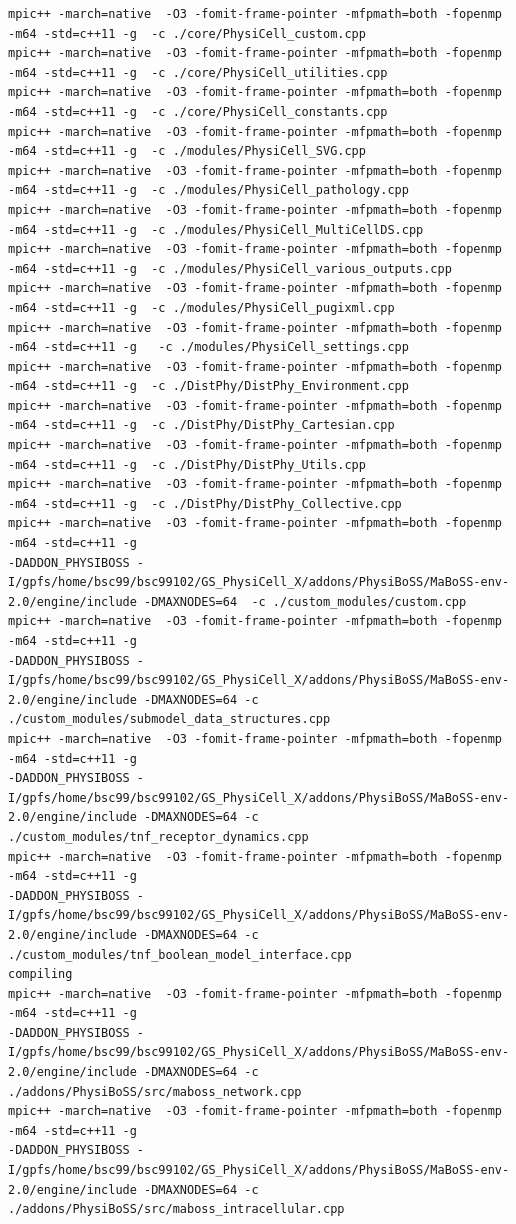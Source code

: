 \documentclass[12pt]{article}
\begin{document}
\begin{tiny}
\begin{verbatim}
mpic++ -march=native  -O3 -fomit-frame-pointer -mfpmath=both -fopenmp -m64 -std=c++11 -g  -c ./core/PhysiCell_custom.cpp 
mpic++ -march=native  -O3 -fomit-frame-pointer -mfpmath=both -fopenmp -m64 -std=c++11 -g  -c ./core/PhysiCell_utilities.cpp 
mpic++ -march=native  -O3 -fomit-frame-pointer -mfpmath=both -fopenmp -m64 -std=c++11 -g  -c ./core/PhysiCell_constants.cpp
mpic++ -march=native  -O3 -fomit-frame-pointer -mfpmath=both -fopenmp -m64 -std=c++11 -g  -c ./modules/PhysiCell_SVG.cpp
mpic++ -march=native  -O3 -fomit-frame-pointer -mfpmath=both -fopenmp -m64 -std=c++11 -g  -c ./modules/PhysiCell_pathology.cpp
mpic++ -march=native  -O3 -fomit-frame-pointer -mfpmath=both -fopenmp -m64 -std=c++11 -g  -c ./modules/PhysiCell_MultiCellDS.cpp
mpic++ -march=native  -O3 -fomit-frame-pointer -mfpmath=both -fopenmp -m64 -std=c++11 -g  -c ./modules/PhysiCell_various_outputs.cpp
mpic++ -march=native  -O3 -fomit-frame-pointer -mfpmath=both -fopenmp -m64 -std=c++11 -g  -c ./modules/PhysiCell_pugixml.cpp
mpic++ -march=native  -O3 -fomit-frame-pointer -mfpmath=both -fopenmp -m64 -std=c++11 -g   -c ./modules/PhysiCell_settings.cpp	
mpic++ -march=native  -O3 -fomit-frame-pointer -mfpmath=both -fopenmp -m64 -std=c++11 -g  -c ./DistPhy/DistPhy_Environment.cpp
mpic++ -march=native  -O3 -fomit-frame-pointer -mfpmath=both -fopenmp -m64 -std=c++11 -g  -c ./DistPhy/DistPhy_Cartesian.cpp
mpic++ -march=native  -O3 -fomit-frame-pointer -mfpmath=both -fopenmp -m64 -std=c++11 -g  -c ./DistPhy/DistPhy_Utils.cpp
mpic++ -march=native  -O3 -fomit-frame-pointer -mfpmath=both -fopenmp -m64 -std=c++11 -g  -c ./DistPhy/DistPhy_Collective.cpp
mpic++ -march=native  -O3 -fomit-frame-pointer -mfpmath=both -fopenmp -m64 -std=c++11 -g  
-DADDON_PHYSIBOSS -I/gpfs/home/bsc99/bsc99102/GS_PhysiCell_X/addons/PhysiBoSS/MaBoSS-env-2.0/engine/include -DMAXNODES=64  -c ./custom_modules/custom.cpp
mpic++ -march=native  -O3 -fomit-frame-pointer -mfpmath=both -fopenmp -m64 -std=c++11 -g  
-DADDON_PHYSIBOSS -I/gpfs/home/bsc99/bsc99102/GS_PhysiCell_X/addons/PhysiBoSS/MaBoSS-env-2.0/engine/include -DMAXNODES=64 -c ./custom_modules/submodel_data_structures.cpp
mpic++ -march=native  -O3 -fomit-frame-pointer -mfpmath=both -fopenmp -m64 -std=c++11 -g  
-DADDON_PHYSIBOSS -I/gpfs/home/bsc99/bsc99102/GS_PhysiCell_X/addons/PhysiBoSS/MaBoSS-env-2.0/engine/include -DMAXNODES=64 -c ./custom_modules/tnf_receptor_dynamics.cpp
mpic++ -march=native  -O3 -fomit-frame-pointer -mfpmath=both -fopenmp -m64 -std=c++11 -g  
-DADDON_PHYSIBOSS -I/gpfs/home/bsc99/bsc99102/GS_PhysiCell_X/addons/PhysiBoSS/MaBoSS-env-2.0/engine/include -DMAXNODES=64 -c ./custom_modules/tnf_boolean_model_interface.cpp
compiling
mpic++ -march=native  -O3 -fomit-frame-pointer -mfpmath=both -fopenmp -m64 -std=c++11 -g  
-DADDON_PHYSIBOSS -I/gpfs/home/bsc99/bsc99102/GS_PhysiCell_X/addons/PhysiBoSS/MaBoSS-env-2.0/engine/include -DMAXNODES=64 -c ./addons/PhysiBoSS/src/maboss_network.cpp
mpic++ -march=native  -O3 -fomit-frame-pointer -mfpmath=both -fopenmp -m64 -std=c++11 -g  
-DADDON_PHYSIBOSS -I/gpfs/home/bsc99/bsc99102/GS_PhysiCell_X/addons/PhysiBoSS/MaBoSS-env-2.0/engine/include -DMAXNODES=64 -c ./addons/PhysiBoSS/src/maboss_intracellular.cpp


\end{verbatim}
\end{tiny}
\end{document}
